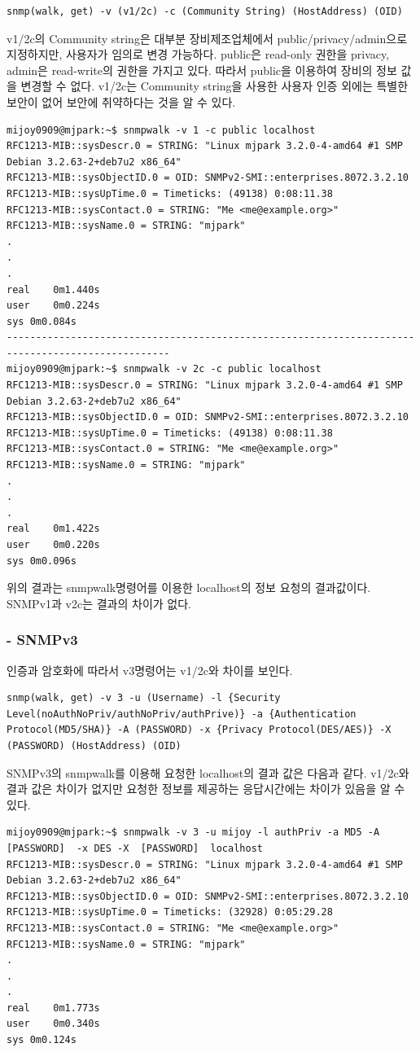 \documentclass[11pt
  , a4paper
  , article
  , oneside
]{memoir}
\begin{document}
\begin{lstlisting}[style=termstyle]
snmp(walk, get) -v (v1/2c) -c (Community String) (HostAddress) (OID) 
\end{lstlisting}

v1/2c의 Community string은 대부분 장비제조업체에서 public/privacy/admin으로 지정하지만, 사용자가 임의로 변경 가능하다. public은 read-only 권한을 privacy, admin은 read-write의 권한을 가지고 있다. 따라서 public을 이용하여 장비의 정보 값을 변경할 수 없다. v1/2c는 Community string을 사용한 사용자 인증 외에는 특별한 보안이 없어 보안에 취약하다는 것을 알 수 있다. 
\begin{lstlisting}[style=termstyle]
mijoy0909@mjpark:~$ snmpwalk -v 1 -c public localhost
RFC1213-MIB::sysDescr.0 = STRING: "Linux mjpark 3.2.0-4-amd64 #1 SMP Debian 3.2.63-2+deb7u2 x86_64"
RFC1213-MIB::sysObjectID.0 = OID: SNMPv2-SMI::enterprises.8072.3.2.10
RFC1213-MIB::sysUpTime.0 = Timeticks: (49138) 0:08:11.38
RFC1213-MIB::sysContact.0 = STRING: "Me <me@example.org>"
RFC1213-MIB::sysName.0 = STRING: "mjpark"
.
.
.
real	0m1.440s
user	0m0.224s
sys	0m0.084s
--------------------------------------------------------------------------------------------------
mijoy0909@mjpark:~$ snmpwalk -v 2c -c public localhost
RFC1213-MIB::sysDescr.0 = STRING: "Linux mjpark 3.2.0-4-amd64 #1 SMP Debian 3.2.63-2+deb7u2 x86_64"
RFC1213-MIB::sysObjectID.0 = OID: SNMPv2-SMI::enterprises.8072.3.2.10
RFC1213-MIB::sysUpTime.0 = Timeticks: (49138) 0:08:11.38
RFC1213-MIB::sysContact.0 = STRING: "Me <me@example.org>"
RFC1213-MIB::sysName.0 = STRING: "mjpark"
.
.
.
real	0m1.422s
user	0m0.220s
sys	0m0.096s
\end{lstlisting}

위의 결과는 snmpwalk명령어를 이용한 localhost의 정보 요청의 결과값이다. SNMPv1과 v2c는 결과의 차이가 없다.
\\
\subsubsection{- SNMPv3}
인증과 암호화에 따라서 v3명령어는 v1/2c와 차이를 보인다.
\begin{lstlisting}[style=termstyle]
snmp(walk, get) -v 3 -u (Username) -l {Security Level(noAuthNoPriv/authNoPriv/authPrive)} -a {Authentication Protocol(MD5/SHA)} -A (PASSWORD) -x {Privacy Protocol(DES/AES)} -X (PASSWORD) (HostAddress) (OID) 
\end{lstlisting}

SNMPv3의 snmpwalk를 이용해 요청한 localhost의 결과 값은 다음과 같다. v1/2c와 결과 값은 차이가 없지만 요청한 정보를 제공하는 응답시간에는 차이가 있음을 알 수 있다.
\begin{lstlisting}[style=termstyle]
mijoy0909@mjpark:~$ snmpwalk -v 3 -u mijoy -l authPriv -a MD5 -A  [PASSWORD]  -x DES -X  [PASSWORD]  localhost
RFC1213-MIB::sysDescr.0 = STRING: "Linux mjpark 3.2.0-4-amd64 #1 SMP Debian 3.2.63-2+deb7u2 x86_64"
RFC1213-MIB::sysObjectID.0 = OID: SNMPv2-SMI::enterprises.8072.3.2.10
RFC1213-MIB::sysUpTime.0 = Timeticks: (32928) 0:05:29.28
RFC1213-MIB::sysContact.0 = STRING: "Me <me@example.org>"
RFC1213-MIB::sysName.0 = STRING: "mjpark"
.
.
.
real	0m1.773s
user	0m0.340s
sys	0m0.124s
\end{lstlisting}
\end{document}

